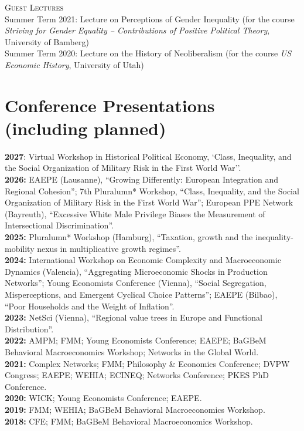 \documentclass[margin]{res}
\begin{document}
\begin{resume}
	\textsc{Guest Lectures} \\
	Summer Term 2021: Lecture on Perceptions of Gender Inequality (for the course \textit{Striving for Gender Equality -- Contributions of Positive Political Theory}, University of Bamberg)\\
	
	Summer Term 2020: Lecture on the History of Neoliberalism (for the course \textit{US Economic History}, University of Utah)\\
	\newpage
	\section{Conference Presentations (including planned)}
	\textbf{2027}: Virtual Workshop in Historical Political Economy, `Class, Inequality, and the Social Organization of Military Risk in the First World War''.\\
	\textbf{2026:} EAEPE (Lausanne), ``Growing Differently: European Integration and Regional Cohesion''; 7th Pluralumn* Workshop, ``Class, Inequality, and the Social Organization of Military Risk in the First World War''; European PPE Network (Bayreuth), ``Excessive White Male Privilege Biases the Measurement of Intersectional Discrimination''.\\
	\textbf{2025:} Pluralumn* Workshop (Hamburg), ``Taxation, growth and the inequality-mobility nexus in multiplicative growth regimes''.\\
	\textbf{2024:} International Workshop on Economic Complexity and Macroeconomic Dynamics (Valencia), ``Aggregating Microeconomic Shocks in Production Networks''; Young Economists Conference (Vienna), ``Social Segregation, Misperceptions, and Emergent Cyclical Choice Patterns''; EAEPE (Bilbao), ``Poor Households and the Weight of Inflation''.\\
	\textbf{2023:} NetSci (Vienna), ``Regional value trees in Europe and Functional Distribution''.\\
	\textbf{2022:} AMPM; FMM; Young Economists Conference; EAEPE; BaGBeM Behavioral Macroeconomics Workshop; Networks in the Global World.\\
	\textbf{2021:} Complex Networks; FMM; Philosophy \& Economics Conference; DVPW Congress; EAEPE; WEHIA; ECINEQ; Networks Conference; PKES PhD Conference.\\
	\textbf{2020:} WICK; Young Economists Conference; EAEPE.\\
	\textbf{2019:} FMM; WEHIA; BaGBeM Behavioral Macroeconomics Workshop.\\
	\textbf{2018:} CFE; FMM; BaGBeM Behavioral Macroeconomics Workshop.\\
	

\end{resume}
\end{document}

